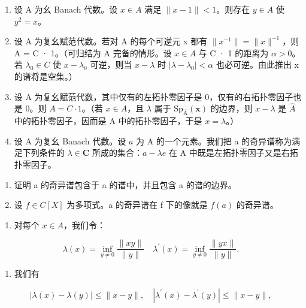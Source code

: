 \begin{enumerate}
\def\labelenumi{\arabic{enumi})}
\setcounter{enumi}{12}
\item
  设 A 为幺 Banach 代数。设 \(x \in A\) 满足 \(\|x - 1\| < 1\)。则存在 \(y \in A\) 使 \(y^{2} = x\)。
\item
  设 A 为复幺赋范代数。若对 A 的每个可逆元 x 都有 \(\|x^{-1}\| = \|x\|^{-1}\)，则 A = C · 1。（可归结为 A 完备的情形。设 \(x \in A\) 与 C · 1 的距离为 \(\alpha > 0\)。若 \(\lambda_{0} \in C\) 使 \(x - \lambda_{0}\) 可逆，则当 \(x - \lambda\) 时 \(|\lambda - \lambda_{0}| < \alpha\) 也必可逆。由此推出 x 的谱将是空集。）
\item
  设 A 为复幺赋范代数，其中仅有的左拓扑零因子是 0，仅有的右拓扑零因子也是 0。则 \(A = C \cdot 1\)。（若 \(x \in A\)，且 \(\lambda\) 属于 \(\mathrm{Sp}_{\widehat{\mathrm{A}}}(\boldsymbol{x})\) 的边界，则 \(x - \lambda\) 是 \(\widehat{A}\) 中的拓扑零因子，因而是 A 中的拓扑零因子，于是 \(x = \lambda\)。）
\item
  设 A 为复幺 Banach 代数。设 \(a\) 为 A 的一个元素。我们把 a 的奇异谱称为满足下列条件的 \(\lambda \in \mathbf{C}\) 所成的集合：\(a - \lambda e\) 在 A 中既是左拓扑零因子又是右拓扑零因子。
\end{enumerate}

\begin{enumerate}
\def\labelenumi{\alph{enumi})}
\item
  证明 a 的奇异谱包含于 a 的谱中，并且包含 a 的谱的边界。
\item
  设 \(f \in C[X]\) 为多项式。a 的奇异谱在 f 下的像就是 \(f(a)\) 的奇异谱。
\end{enumerate}

\begin{enumerate}
\def\labelenumi{\arabic{enumi})}
\setcounter{enumi}{16}
\tightlist
\item
  对每个 \(x \in A\)，我们令：
\end{enumerate}

\[
\lambda (x) = \inf _ {y \neq 0} \frac {\| x y \|}{\| y \|} \quad \lambda^ {\prime} (x) = \inf _ {y \neq 0} \frac {\| y x \|}{\| y \|}.
\]

\begin{enumerate}
\def\labelenumi{\alph{enumi})}
\tightlist
\item
我们有
\end{enumerate}

\[
| \lambda (x) - \lambda (y) | \leqslant \| x - y \|, \quad | \lambda^ {\prime} (x) - \lambda^ {\prime} (y) | \leqslant \| x - y \|,
\]

